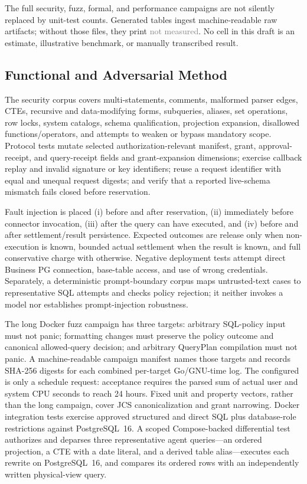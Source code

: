 \documentclass[10pt,journal,compsoc]{IEEEtran}
\newcommand{\code}[1]{\texttt{\detokenize{#1}}}
\newcommand{\notmeasured}{\textcolor{gray}{not measured}}
\begin{document}
The full security, fuzz, formal, and performance campaigns are not silently
replaced by unit-test counts.  Generated tables ingest machine-readable raw
artifacts; without those files, they print \notmeasured.  No cell in this draft
is an estimate, illustrative benchmark, or manually transcribed result.

\subsection{Functional and Adversarial Method}

The security corpus covers multi-statements, comments, malformed parser edges,
CTEs, recursive and data-modifying forms, subqueries, aliases, set operations,
row locks, system catalogs, schema qualification, projection expansion,
disallowed functions/operators, and attempts to weaken or bypass mandatory
scope.  Protocol tests mutate selected authorization-relevant manifest, grant,
approval-receipt, and query-receipt fields and grant-expansion dimensions;
exercise callback replay and invalid signature or key identifiers; reuse a
request identifier with equal and unequal request digests; and verify that a
reported live-schema mismatch fails closed before reservation.

Fault injection is placed (i) before and after reservation, (ii) immediately
before connector invocation, (iii) after the query can have executed, and
(iv) before and after settlement/result persistence.  Expected outcomes are
release only when non-execution is known, bounded actual settlement when the
result is known, and full conservative charge with \code{INDETERMINATE}
otherwise.  Negative deployment tests attempt direct Business PG connection,
base-table access, and use of wrong credentials.  Separately, a deterministic
prompt-boundary corpus maps untrusted-text cases to representative SQL attempts
and checks policy rejection; it neither invokes a model nor establishes
prompt-injection robustness.

The long Docker fuzz campaign has three targets: arbitrary SQL-policy input must
not panic; formatting changes must preserve the policy outcome and canonical
allowed-query decision; and arbitrary QueryPlan compilation must not panic.  A
machine-readable campaign manifest names those targets and records SHA-256
digests for each combined per-target Go/GNU-time log.  The configured
\code{FUZZ\_CPU\_HOURS=24} is only a schedule request: acceptance requires the
parsed sum of actual user and system CPU seconds to reach 24 hours.  Fixed unit
and property vectors, rather than the long campaign, cover JCS canonicalization
and grant narrowing.  Docker integration tests exercise approved structured and
direct SQL plus database-role restrictions against PostgreSQL~16.  A scoped
Compose-backed differential test authorizes and deparses three representative
agent queries---an ordered projection, a CTE with a date literal, and a derived
table alias---executes each rewrite on PostgreSQL~16, and compares its ordered
rows with an independently written physical-view query.
\end{document}
